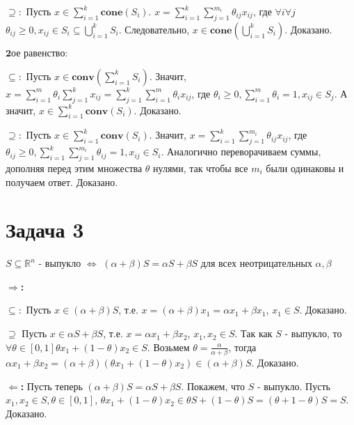 \documentclass[a4paper]{article}
\begin{document}
$\supseteq:$ Пусть $x \in \sum_{i=1}^{k}\textbf{cone}(S_{i})$. $x = \sum_{i=1}^{k}\sum_{j=1}^{m_i}\theta_{ij}x_{ij}$, где $\forall{i}\forall{j}$  $\theta_{ij} \geq 0, x_{ij} \in S_{i} \subseteq \bigcup_{i=1}^{k}S_{i}$. Следовательно, $x \in \textbf{cone}(\bigcup_{i=1}^{k}S_{i})$. Доказано.

$\textbf{2ое равенство:}$

$\subseteq:$ Пусть $x \in \textbf{conv}(\sum_{i=1}^{k}S_{i})$. Значит, $x = \sum_{i=1}^{m}\theta_{i}\sum_{j=1}^{k}x_{ij} = \sum_{j=1}^{k}\sum_{i=1}^{m}\theta_{i}x_{ij}$, где $\theta_{i} \geq 0 , \sum_{i=1}^{m}\theta_{i} = 1, x_{ij} \in S_{j}$. А значит, $x \in \sum_{i=1}^{k}\textbf{conv}(S_{i})$. Доказано.

$\supseteq:$ Пусть $x \in \sum_{i=1}^{k}\textbf{conv}(S_{i})$. Значит, $x = \sum_{i=1}^{k}\sum_{j=1}^{m_i}\theta_{ij}x_{ij}$, где $\theta_{ij} \geq 0, \sum_{i=1}^{k}\sum_{j=1}^{m_i}\theta_{ij} = 1, x_{ij} \in S_{i}$. Аналогично переворачиваем суммы, дополняя перед этим множества $\theta$ нулями, так чтобы все $m_{i}$ были одинаковы и получаем ответ. Доказано.

\section*{Задача 3}
$S \subseteq \mathbb{R}^{n}$ - выпукло $\Longleftrightarrow$ $(\alpha + \beta)S = \alpha S + \beta S$ для всех неотрицательных $\alpha, \beta$

\textbf{$\Longrightarrow$:} 

$\subseteq:$ Пусть $x \in (\alpha + \beta)S$, т.е. $x = (\alpha + \beta)x_{1} = \alpha x_{1} + \beta x_{1}$, $x_{1} \in S$. Доказано.

$\supseteq$ Пусть $x \in \alpha S + \beta S$, т.е. $x = \alpha x_{1} + \beta x_{2}$, $x_{1}, x_{2} \in S$. Так как $S$ - выпукло, то $\forall\theta \in [0,1] \theta x_{1} + (1 - \theta)x_{2} \in S$. Возьмем $\theta = \frac{\alpha}{\alpha + \beta}$, тогда $\alpha x_{1} + \beta x_{2} = (\alpha + \beta)(\theta x_{1} + (1 - \theta)x_{2}) \in (\alpha + \beta)S$. Доказано.

\textbf{$\Longleftarrow$:} Пусть теперь $(\alpha + \beta)S = \alpha S + \beta S$. Покажем, что $S$ - выпукло. Пусть $x_{1}, x_{2} \in S, \theta \in [0,1]$, $\theta x_{1} + (1 - \theta)x_{2} \in \theta S + (1 - \theta)S = (\theta + 1-\theta)S = S$. Доказано.  
\end{document}
